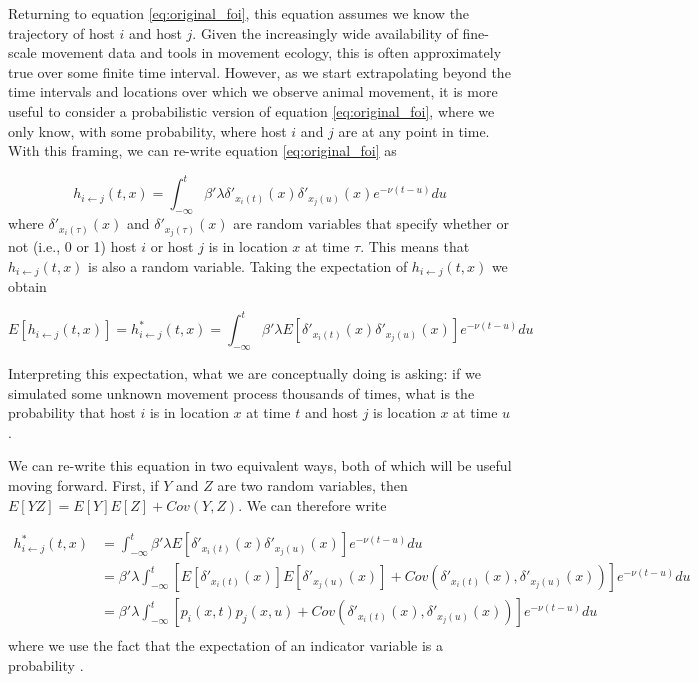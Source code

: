 \documentclass[letterpaper]{article}
\begin{document}
Returning to equation \ref{eq:original_foi}, this equation assumes we know the trajectory of host $i$ and host $j$.  Given the increasingly wide availability of fine-scale movement data and tools in movement ecology, this is often approximately true over some finite time interval. However, as we start extrapolating beyond the time intervals and locations over which we observe animal movement, it is more useful to consider a probabilistic version of equation \ref{eq:original_foi}, where we only know, with some probability, where host $i$ and $j$ are at any point in time. With this framing, we can re-write equation \ref{eq:original_foi} as

\begin{equation}
    h_{i \leftarrow j}(t, x) = \int_{-\infty}^{t} \beta' \lambda \delta'_{x_i(t)}(x) \delta'_{x_j(u)}(x) e^{-\nu(t - u)} du
    \label{eq:prob_foi}
\end{equation}
where $\delta'_{x_i(\tau)}(x)$ and $\delta'_{x_j(\tau)}(x)$ are random variables that specify whether or not (i.e., 0 or 1) host $i$ or host $j$ is in location $x$ at time $\tau$.  This means that $h_{i \leftarrow j}(t, x)$ is also a random variable. Taking the expectation of $h_{i \leftarrow j}(t, x)$ we obtain

\begin{equation}
    E[h_{i \leftarrow j}(t, x)] = h^*_{i \leftarrow j}(t, x) = \int_{-\infty}^{t} \beta' \lambda E[\delta'_{x_i(t)}(x) \delta'_{x_j(u)}(x)] e^{-\nu(t - u)} du
    \label{eq:expected_foi}
\end{equation}

Interpreting this expectation, what we are conceptually doing is asking: if we simulated some unknown movement process thousands of times, what is the probability that host $i$ is in location $x$ at time $t$ and host $j$ is location $x$ at time $u$. 

We can re-write this equation in two equivalent ways, both of which will be useful moving forward.  First, if $Y$ and $Z$ are two random variables, then $E[YZ] = E[Y]E[Z] + Cov(Y, Z)$.  We can therefore write

\begin{equation}
    \begin{aligned}
        h^*_{i \leftarrow j}(t, x) &= \int_{-\infty}^{t} \beta' \lambda E[\delta'_{x_i(t)}(x) \delta'_{x_j(u)}(x)] e^{-\nu(t - u)} du \\
        &= \beta' \lambda \int_{-\infty}^{t} [E[\delta'_{x_i(t)}(x)] E[\delta'_{x_j(u)}(x)] + Cov(\delta'_{x_i(t)}(x), \delta'_{x_j(u)}(x))] e^{-\nu(t - u)} du \\
        &= \beta' \lambda \int_{-\infty}^{t} [p_i(x, t) p_j(x, u) + Cov(\delta'_{x_i(t)}(x), \delta'_{x_j(u)}(x))] e^{-\nu(t - u)} du \\
    \end{aligned}
    \label{eq:foi_cov}
\end{equation}
where we use the fact that the expectation of an indicator variable is a probability \citep{Grimmett2001}.
\end{document}
